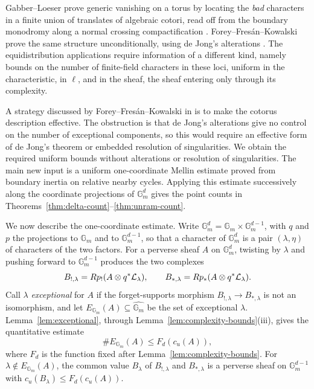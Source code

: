 \documentclass[12pt,reqno]{amsart}
\theoremstyle{definition}
\theoremstyle{plain}
\theoremstyle{definition}
\theoremstyle{remark}
\newcommand{\bbG}{\mathbb{G}}  \newcommand{\bbH}{\mathbb{H}}
\newcommand{\Gm}{\bbG_m}
\newcommand{\cu}{c_u}
\begin{document}
Gabber--Loeser prove generic vanishing on a torus by locating the \emph{bad} characters in a finite
union of translates of algebraic cotori, read off from the boundary monodromy along a normal crossing
compactification \cite[Th.~4.1.1']{GabberLoeser1996}.  Forey--Fres\'an--Kowalski prove the same
structure unconditionally, using de Jong's alterations
\cite[Th.~2.12, Prop.~2.13]{ForeyFresanKowalski2021}.  The equidistribution applications require information
of a different kind, namely bounds on the number of finite-field characters in these loci, uniform in
the characteristic, in \(\ell\), and in the sheaf, the sheaf entering only through its complexity.

A strategy discussed by Forey--Fres\'an--Kowalski in \cite[Rem.~2.4]{ForeyFresanKowalski2021} is to make the
cotorus description effective.  The obstruction is that de Jong's alterations give no control on the
number of exceptional components, so this would require an effective form of de Jong's theorem or
embedded resolution of singularities.  We obtain the required uniform bounds without alterations or
resolution of singularities.  The main new input is a uniform one-coordinate Mellin estimate proved
from boundary inertia on relative nearby cycles.  Applying this estimate successively along the
coordinate projections of \(\Gm^d\) gives the point counts in
Theorems~\ref{thm:delta-count}--\ref{thm:unram-count}.

We now describe the one-coordinate estimate.  Write
\(\Gm^d=\Gm\times\Gm^{d-1}\), with \(q\) and \(p\) the projections to \(\Gm\) and to \(\Gm^{d-1}\), so
that a character of \(\Gm^d\) is a pair \((\lambda,\eta)\) of characters of the two factors.  For a
perverse sheaf \(A\) on \(\Gm^d\), twisting by \(\lambda\) and pushing forward to \(\Gm^{d-1}\)
produces the two complexes
\[
        B_{!,\lambda}=Rp_!(A\otimes q^*\mathcal{L}_\lambda),
        \qquad B_{*,\lambda}=Rp_*(A\otimes q^*\mathcal{L}_\lambda).
\]
Call \(\lambda\) \emph{exceptional} for \(A\) if the forget-supports morphism
\(B_{!,\lambda}\to B_{*,\lambda}\) is not an isomorphism, and let \(E_{\Gm}(A)\subseteq\widehat{\Gm}\)
be the set of exceptional \(\lambda\).  Lemma~\ref{lem:exceptional}, through
Lemma~\ref{lem:complexity-bounds}(iii), gives the quantitative estimate
\[
        \#E_{\Gm}(A)\le F_{d}(\cu(A)),
\]
where \(F_{d}\) is the function fixed after Lemma~\ref{lem:complexity-bounds}.  For
\(\lambda\notin E_{\Gm}(A)\), the common value \(B_\lambda\) of \(B_{!,\lambda}\) and
\(B_{*,\lambda}\) is a perverse sheaf on \(\Gm^{d-1}\) with \(\cu(B_\lambda)\le F_{d}(\cu(A))\).
\end{document}
